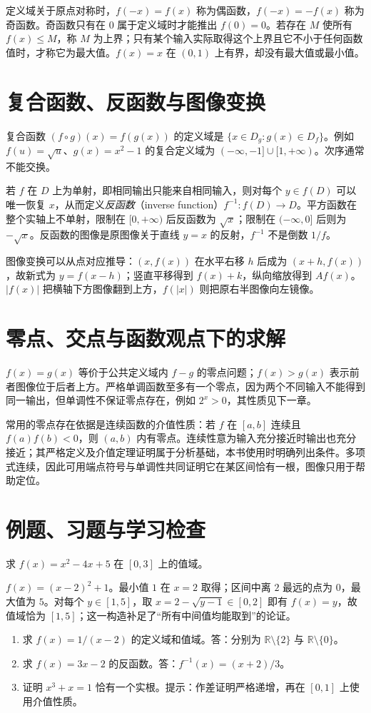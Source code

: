 定义域关于原点对称时，$f(-x)=f(x)$ 称为偶函数，$f(-x)=-f(x)$ 称为奇函数。奇函数只有在 $0$ 属于定义域时才能推出 $f(0)=0$。若存在 $M$ 使所有 $f(x)\le M$，称 $M$ 为上界；只有某个输入实际取得这个上界且它不小于任何函数值时，才称它为最大值。$f(x)=x$ 在 $(0,1)$ 上有界，却没有最大值或最小值。

\section{复合函数、反函数与图像变换}
复合函数 $(f\circ g)(x)=f(g(x))$ 的定义域是 $\{x\in D_g:g(x)\in D_f\}$。例如 $f(u)=\sqrt u$、$g(x)=x^2-1$ 的复合定义域为 $(-\infty,-1]\cup[1,+\infty)$。次序通常不能交换。

若 $f$ 在 $D$ 上为单射，即相同输出只能来自相同输入，则对每个 $y\in f(D)$ 可以唯一恢复 $x$，从而定义\emph{反函数}（inverse function）$f^{-1}:f(D)\to D$。平方函数在整个实轴上不单射，限制在 $[0,+\infty)$ 后反函数为 $\sqrt x$；限制在 $(-\infty,0]$ 后则为 $-\sqrt x$。反函数的图像是原图像关于直线 $y=x$ 的反射，$f^{-1}$ 不是倒数 $1/f$。

图像变换可以从点对应推导：$(x,f(x))$ 在水平右移 $h$ 后成为 $(x+h,f(x))$，故新式为 $y=f(x-h)$；竖直平移得到 $f(x)+k$，纵向缩放得到 $Af(x)$。$|f(x)|$ 把横轴下方图像翻到上方，$f(|x|)$ 则把原右半图像向左镜像。

\section{零点、交点与函数观点下的求解}
$f(x)=g(x)$ 等价于公共定义域内 $f-g$ 的零点问题；$f(x)>g(x)$ 表示前者图像位于后者上方。严格单调函数至多有一个零点，因为两个不同输入不能得到同一输出，但单调性不保证零点存在，例如 $2^x>0$，其性质见下一章。

常用的零点存在依据是连续函数的介值性质：若 $f$ 在 $[a,b]$ 连续且 $f(a)f(b)<0$，则 $(a,b)$ 内有零点。连续性意为输入充分接近时输出也充分接近；其严格定义及介值定理证明属于分析基础，本书使用时明确列出条件。多项式连续，因此可用端点符号与单调性共同证明它在某区间恰有一根，图像只用于帮助定位。

\section{例题、习题与学习检查}
\begin{example}
求 $f(x)=x^2-4x+5$ 在 $[0,3]$ 上的值域。
\end{example}
\begin{solve}
$f(x)=(x-2)^2+1$。最小值 $1$ 在 $x=2$ 取得；区间中离 $2$ 最远的点为 $0$，最大值为 $5$。对每个 $y\in[1,5]$，取 $x=2-\sqrt{y-1}\in[0,2]$ 即有 $f(x)=y$，故值域恰为 $[1,5]$；这一构造补足了“所有中间值均能取到”的论证。
\end{solve}
\begin{enumerate}
\item 求 $f(x)=1/(x-2)$ 的定义域和值域。答：分别为 $\mathbb R\setminus\{2\}$ 与 $\mathbb R\setminus\{0\}$。
\item 求 $f(x)=3x-2$ 的反函数。答：$f^{-1}(x)=(x+2)/3$。
\item 证明 $x^3+x=1$ 恰有一个实根。提示：作差证明严格递增，再在 $[0,1]$ 上使用介值性质。
\end{enumerate}

